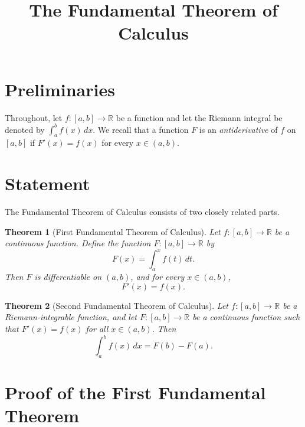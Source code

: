 \documentclass[11pt,a4paper]{article}
\title{\textbf{The Fundamental Theorem of Calculus}}
\author{}
\date{}
\newtheorem{theorem}{Theorem}
\begin{document}
\maketitle

\section{Preliminaries}

Throughout, let $f\colon [a,b]\to\mathbb{R}$ be a function and let the Riemann integral be denoted by $\int_a^b f(x)\,dx$. We recall that a function $F$ is an \emph{antiderivative} of $f$ on $[a,b]$ if $F'(x)=f(x)$ for every $x\in(a,b)$.

\section{Statement}

The Fundamental Theorem of Calculus consists of two closely related parts.

\begin{theorem}[First Fundamental Theorem of Calculus]
Let $f\colon [a,b]\to\mathbb{R}$ be a continuous function. Define the function $F\colon [a,b]\to\mathbb{R}$ by
\[
    F(x) = \int_a^x f(t)\,dt.
\]
Then $F$ is differentiable on $(a,b)$, and for every $x\in(a,b)$,
\[
    F'(x) = f(x).
\]
\end{theorem}

\begin{theorem}[Second Fundamental Theorem of Calculus]
Let $f\colon [a,b]\to\mathbb{R}$ be a Riemann-integrable function, and let $F\colon [a,b]\to\mathbb{R}$ be a continuous function such that $F'(x)=f(x)$ for all $x\in(a,b)$. Then
\[
    \int_a^b f(x)\,dx = F(b) - F(a).
\]
\end{theorem}

\section{Proof of the First Fundamental Theorem}
\end{document}
